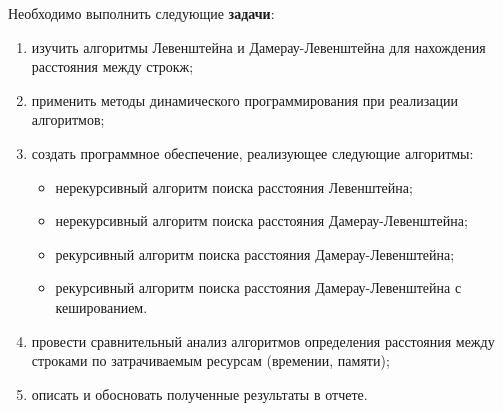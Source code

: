 Необходимо выполнить следующие \textbf{задачи}:
\begin{enumerate}[label={\arabic*)}]
        \item изучить алгоритмы Левенштейна и Дамерау-Левенштейна для нахождения расстояния между строкж;
        \item применить методы динамического программирования при реализации алгоритмов; 
	\item создать программное обеспечение, реализующее следующие алгоритмы:
	\begin{itemize}[label=---]
		\item нерекурсивный алгоритм поиска расстояния Левенштейна;
		\item нерекурсивный алгоритм поиска расстояния Дамерау-Левенштейна;
		\item рекурсивный алгоритм поиска расстояния Дамерау-Левенштейна;
		\item рекурсивный алгоритм поиска расстояния Дамерау-Левенштейна с кешированием.
	\end{itemize}
	\item провести сравнительный анализ алгоритмов определения расстояния между строками по затрачиваемым ресурсам (времении, памяти);
        \item описать и обосновать полученные результаты в отчете.
\end{enumerate}